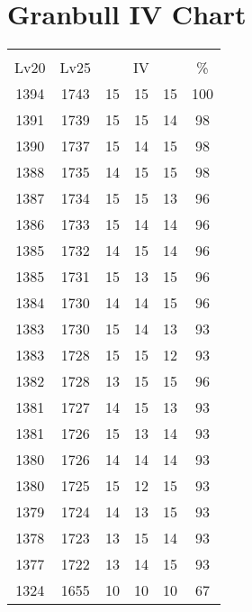\documentclass{article}%
\begin{document}
%
\normalsize%
\section{Granbull IV Chart}%
\label{sec:Granbull IV Chart}%
\renewcommand{\arraystretch}{1.5}%
\begin{tabular}{|c|c|c|c|c|c|}%
\hline%
\multicolumn{6}{|c|}{\textcolor{white}{ 
\linebreak{Granbull}
}%
\cellcolor{black}}\\%
\multicolumn{1}{|c}{Lv20}&\multicolumn{1}{c|}{Lv25}&\multicolumn{3}{c|}{IV}&\multicolumn{1}{|c|}{\%}\\%
\hline%
\rowcolor{color100}%
1394&1743&15&15&15&100\\%
\hline%
\rowcolor{color98}%
1391&1739&15&15&14&98\\%
\hline%
\rowcolor{color98}%
1390&1737&15&14&15&98\\%
\hline%
\rowcolor{color98}%
1388&1735&14&15&15&98\\%
\hline%
\rowcolor{color96}%
1387&1734&15&15&13&96\\%
\hline%
\rowcolor{color96}%
1386&1733&15&14&14&96\\%
\hline%
\rowcolor{color96}%
1385&1732&14&15&14&96\\%
\hline%
\rowcolor{color96}%
1385&1731&15&13&15&96\\%
\hline%
\rowcolor{color96}%
1384&1730&14&14&15&96\\%
\hline%
\rowcolor{color93}%
1383&1730&15&14&13&93\\%
\hline%
\rowcolor{color93}%
1383&1728&15&15&12&93\\%
\hline%
\rowcolor{color96}%
1382&1728&13&15&15&96\\%
\hline%
\rowcolor{color93}%
1381&1727&14&15&13&93\\%
\hline%
\rowcolor{color93}%
1381&1726&15&13&14&93\\%
\hline%
\rowcolor{color93}%
1380&1726&14&14&14&93\\%
\hline%
\rowcolor{color93}%
1380&1725&15&12&15&93\\%
\hline%
\rowcolor{color93}%
1379&1724&14&13&15&93\\%
\hline%
\rowcolor{color93}%
1378&1723&13&15&14&93\\%
\hline%
\rowcolor{color93}%
1377&1722&13&14&15&93\\%
\hline%
\rowcolor{color91}%
1324&1655&10&10&10&67\\%
\end{tabular}

%
\end{document}
